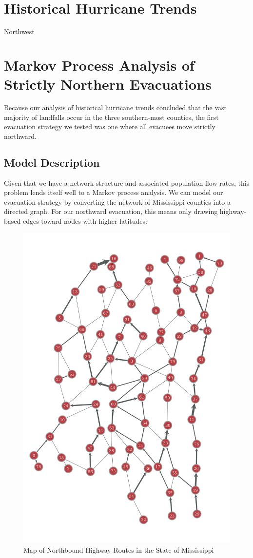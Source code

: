 \documentclass[titlepage]{article}
\begin{document}
\section{Historical Hurricane Trends}
\label{sec:hurricanes}
  \par
    Northwest


\section{Markov Process Analysis of Strictly Northern Evacuations}
\label{sec:markov}
  Because our analysis of historical hurricane trends concluded that the vast majority of landfalls occur in the three southern-most counties, the first evacuation strategy we tested was one where all evacuees move strictly northward.
  \subsection{Model Description}
    Given that we have a network structure and associated population flow rates, this problem lends itself well to a Markov process analysis. We can model our evacuation strategy by converting the network of Mississippi counties into a directed graph. For our northward evacuation, this means only drawing highway-based edges toward nodes with higher latitudes:
    \begin{figure}[H]
      \centering
      \includegraphics[width=.5\textwidth]{figures/full_directed_NS.pdf}
      \caption{Map of Northbound Highway Routes in the State of Mississippi \cite{ms_highways}}
    \end{figure}
\end{document}
